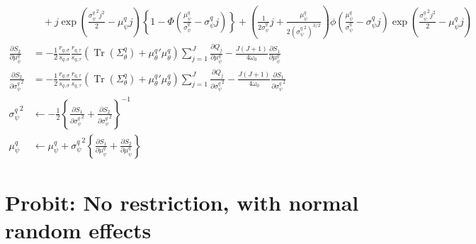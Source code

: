 \documentclass[11pt]{article}
\DeclareMathOperator{\Tr}{Tr}
\begin{document}
\begin{align*}
  &\quad +j\exp\left(\frac{{\sigma_{\psi}^{q}}^{2}j^{2}}{2}-\mu_{\psi}^{q}j \right)\left\{1-\Phi\left(\frac{\mu_{\psi}^{q}}{\sigma_{\psi}^{q}}-\sigma_{\psi}^{q}j\right) \right\}+\left(\frac{1}{2\sigma_{\psi}^{q}}j +\frac{\mu_{\psi}^{q}}{2\left({\sigma_{\psi}^{q}}^{2} \right)^{3/2}}\right)\phi\left(\frac{\mu_{\psi}^{q}}{\sigma_{\psi}^{q}}-\sigma_{\psi}^{q}j\right)\exp\left(\frac{{\sigma_{\psi}^{q}}^{2}j^{2}}{2} -\mu_{\psi}^{q}j \right)\\
  \frac{\partial S_{2}}{\partial \mu_{\psi}^{q}} &= -\frac{1}{2}\frac{r_{q,\sigma}}{s_{q,\sigma}}\frac{r_{q,\tau}}{s_{q,\tau}}\left(\Tr\left(\Sigma_{\theta}^{q}\right)+{\mu_{\theta}^{q}}'\mu_{\theta}^{q} \right)\sum_{j=1}^{J}\frac{\partial Q_{j}}{\partial \mu_{\psi}^{q}} -\frac{J\left(J+1\right)}{4\omega_{0}}\frac{\partial S_{1}}{\partial \mu_{\psi}^{q}}\\
  \frac{\partial S_{2}}{\partial {\sigma_{\psi}^{q}}^{2}} &= -\frac{1}{2}\frac{r_{q,\sigma}}{s_{q,\sigma}}\frac{r_{q,\tau}}{s_{q,\tau}}\left(\Tr\left(\Sigma_{\theta}^{q}\right)+{\mu_{\theta}^{q}}'\mu_{\theta}^{q} \right)\sum_{j=1}^{J}\frac{\partial Q_{j}}{\partial {\sigma_{\psi}^{q}}^{2}} -\frac{J\left(J+1\right)}{4\omega_{0}}\frac{\partial S_{1}}{\partial {\sigma_{\psi}^{q}}^{2}}\\
  {\sigma_{\psi}^{q}}^{2} &\leftarrow -\frac{1}{2}\left\{\frac{\partial S_{1}}{\partial {\sigma_{\psi}^{q}}^{2}}+\frac{\partial S_{2}}{\partial {\sigma_{\psi}^{q}}^{2}} \right\}^{-1}\\
  \mu_{\psi}^{q} &\leftarrow \mu_{\psi}^{q} +{\sigma_{\psi}^{q}}^{2}\left\{\frac{\partial S_{1}}{\partial \mu_{\psi}^{q}}+\frac{\partial S_{2}}{\partial \mu_{\psi}^{q}} \right\}
\end{align*}

\section{Probit: No restriction, with normal random effects}
\end{document}
